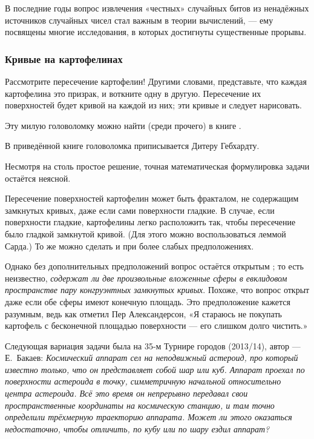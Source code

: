 В последние годы вопрос извлечения «честных» %
случайных битов из ненадёжных источников случайных чисел стал важным в теории вычислений, --- ему посвящены многие исследования, в которых достигнуты существенные прорывы.

\subsubsection*{Кривые на картофелинах}

{\sloppy

Рассмотрите пересечение картофелин!
Другими словами, представьте, что каждая картофелина это призрак, и воткните одну в другую.
Пересечение их поверхностей будет кривой на каждой из них; эти кривые и следует нарисовать.

}

Эту милую головоломку можно найти (среди прочего) в книге \cite{5}.

\begin{addedbytheeditors}
В приведённой книге головоломка приписывается Дитеру Гебхардту.

Несмотря на столь простое решение, точная математическая формулировка задачи остаётся неясной.

Пересечение поверхностей картофелин может быть фракталом, не содержащим замкнутых кривых, даже если сами поверхности гладкие.
В случае, если поверхности гладкие, картофелины легко расположить так, чтобы пересечение было гладкой замкнутой кривой.
(Для этого можно воспользоваться леммой Сарда.)
То же можно сделать и при более слабых предположениях.

Однако без дополнительных предположений вопрос остаётся открытым \cite{agol};
то есть неизвестно, \emph{содержат ли две произвольные вложенные сферы в евклидовом пространстве пару конгруэнтных замкнутых кривых}. 
Похоже, что вопрос открыт даже если обе сферы имеют конечную площадь.
Это предположение кажется разумным, ведь как отметил Пер Александерсон,
«Я стараюсь не покупать картофель с бесконечной площадью поверхности --- его слишком долго чистить.»

Следующая вариация задачи была на 35-м Турнире городов (2013/14), автор --- Е.~Бакаев:  \textit{Космический аппарат сел на неподвижный астероид, про который известно только, что он представляет собой шар или куб. Аппарат проехал по поверхности астероида в точку, симметричную начальной относительно центра астероида. Всё это время он непрерывно передавал свои пространственные координаты на космическую станцию, и там точно определили трёхмерную траекторию аппарата. Может ли этого оказаться недостаточно, чтобы отличить, по кубу или по шару ездил аппарат?}
\pr
\end{addedbytheeditors}

